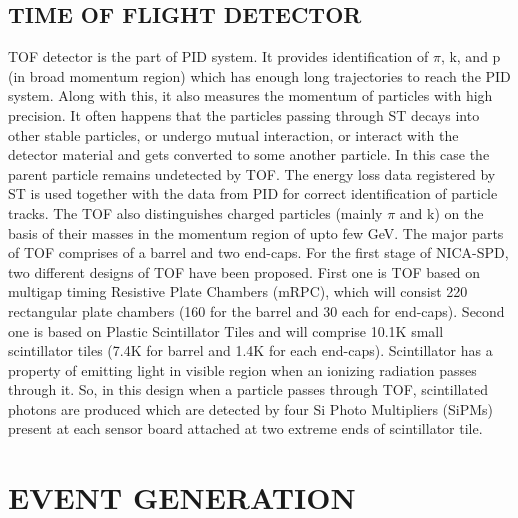 \documentclass[12pt, twocolumn]{article}
\begin{document}
\subsection{TIME OF FLIGHT DETECTOR}
TOF detector is the part of PID system. It provides identification of $\pi$, k, and p (in broad momentum region) which has enough long trajectories to reach the PID system. Along with this, it also measures the momentum of particles with high precision. It often happens that the particles passing through ST decays into other stable particles, or undergo mutual interaction, or interact with the detector material and gets converted to some another particle. In this case the parent particle remains undetected by TOF. The energy loss data registered by ST is used together with the data from PID for correct identification of particle tracks. The TOF also distinguishes charged particles (mainly $\pi$ and k) on the basis of their masses in the momentum region of upto few GeV. The major parts of TOF comprises of a barrel and two end-caps. For the first stage of NICA-SPD, two different designs of TOF have been proposed. First one is TOF based on multigap timing Resistive Plate Chambers (mRPC), which will consist 220 rectangular plate chambers (160 for the barrel and 30 each for end-caps). Second one is based on Plastic Scintillator Tiles and will comprise 10.1K small scintillator tiles (7.4K for barrel and 1.4K for each end-caps). Scintillator has a property of emitting light in visible region when an ionizing radiation passes through it. So, in this design when a particle passes through TOF, scintillated photons are produced which are detected by four Si Photo Multipliers (SiPMs) present at each sensor board attached at two extreme ends of scintillator tile.

\section{EVENT GENERATION}
\end{document}
